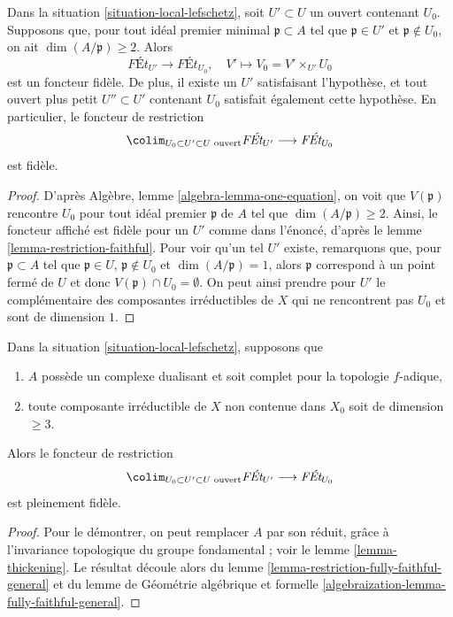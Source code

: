 \begin{lemma}
\label{lemma-faithful-general}
Dans la situation \ref{situation-local-lefschetz}, soit $U' \subset U$
un ouvert contenant $U_0$. Supposons que, pour tout idéal premier minimal $\mathfrak p \subset A$
tel que $\mathfrak p \in U'$ et $\mathfrak p \not \in U_0$, on ait
$\dim(A/\mathfrak p) \geq 2$. Alors
$$
\textit{F\'Et}_{U'} \longrightarrow \textit{F\'Et}_{U_0},\quad
V' \longmapsto V_0 = V' \times_{U'} U_0
$$
est un foncteur fidèle. De plus, il existe un $U'$ satisfaisant
l'hypothèse, et tout ouvert plus petit $U'' \subset U'$ contenant
$U_0$ satisfait également cette hypothèse. En particulier, le
foncteur de restriction
$$
\colim_{U_0 \subset U' \subset U\text{ ouvert}} \textit{F\'Et}_{U'}
\longrightarrow
\textit{F\'Et}_{U_0}
$$
est fidèle.
\end{lemma}

\begin{proof}
D'après Algèbre, lemme \ref{algebra-lemma-one-equation},
on voit que $V(\mathfrak p)$ rencontre $U_0$ pour
tout idéal premier $\mathfrak p$ de $A$ tel que $\dim(A/\mathfrak p) \geq 2$.
Ainsi, le foncteur affiché est fidèle pour un $U'$ comme dans l'énoncé,
d'après le lemme \ref{lemma-restriction-faithful}.
Pour voir qu'un tel $U'$ existe, remarquons que, pour
$\mathfrak p \subset A$ tel que $\mathfrak p \in U$,
$\mathfrak p \not \in U_0$ et $\dim(A/\mathfrak p) = 1$,
alors $\mathfrak p$ correspond à un point fermé de $U$
et donc $V(\mathfrak p) \cap U_0 = \emptyset$.
On peut ainsi prendre pour $U'$ le complémentaire des composantes
irréductibles de $X$ qui ne rencontrent pas $U_0$ et sont de dimension $1$.
\end{proof}

\begin{lemma}
\label{lemma-fully-faithful-general-better}
Dans la situation \ref{situation-local-lefschetz}, supposons que
\begin{enumerate}
\item $A$ possède un complexe dualisant et soit complet pour la topologie $f$-adique,
\item toute composante irréductible de $X$ non contenue dans $X_0$
soit de dimension $\geq 3$.
\end{enumerate}
Alors le foncteur de restriction
$$
\colim_{U_0 \subset U' \subset U\text{ ouvert}} \textit{F\'Et}_{U'}
\longrightarrow
\textit{F\'Et}_{U_0}
$$
est pleinement fidèle.
\end{lemma}

\begin{proof}
Pour le démontrer, on peut remplacer $A$ par son réduit, grâce à l'invariance topologique
du groupe fondamental ; voir le lemme \ref{lemma-thickening}.
Le résultat découle alors du
lemme \ref{lemma-restriction-fully-faithful-general}
et du lemme de Géométrie algébrique et formelle
\ref{algebraization-lemma-fully-faithful-general}.
\end{proof}

